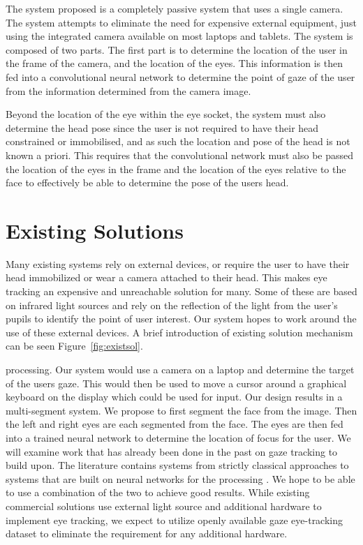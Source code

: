 \documentclass[10pt,twocolumn,letterpaper]{article}
\begin{document}
The system proposed is a completely passive system that uses a single
camera. The system attempts to eliminate the need for expensive
external equipment, just using the integrated camera available on most
laptops and tablets. The system is composed of two parts. The first
part is to determine the location of the user in the frame of the camera, and the
location of the eyes. This information is then fed into a
convolutional neural network to determine the point of gaze of the
user from the information determined from the camera image.

Beyond the location of the eye within the eye socket, the system must
also determine the head pose since the user is not required to have
their head constrained or immobilised, and as such the location and
pose of the head is not known a priori. This requires that the
convolutional network must also be passed the location of the eyes in
the frame and the location of the eyes relative to the face to effectively be
able to determine the pose of the users head.


\section{Existing Solutions}
Many existing systems rely on external
devices\cite{eyetrackerlist}\cite{tobii_1}, or require the user to
have their head immobilized or wear a camera attached to their
head. This makes eye tracking an expensive and unreachable solution
for many. Some of these are based on infrared light sources and rely
on the reflection of the light from the user's pupils to identify the
point of user interest. Our system hopes to work around the use of
these external devices. A brief introduction of existing solution
mechanism can be seen Figure~\ref{fig:existsol}.




processing. Our system would use a camera on a laptop and determine
the target of the users gaze. This would then be used to move a cursor
around a graphical keyboard on the display which could be used for
input. Our design results in a multi-segment system. We propose to
first segment the face from the image. Then the left and right eyes
are each segmented from the face. The eyes are then fed into a trained
neural network to determine the location of focus for the user. We
will examine work that has already been done in the past on gaze
tracking to build upon. The literature contains systems from strictly
classical approaches to systems that are built on neural networks for
the processing \cite{krafka} \cite{mcmurrough} \cite{weidenbacher}
\cite{baluja} \cite{cazzato} \cite{li}. We hope to be able to use a
combination of the two to achieve good results. While existing
commercial solutions use external light source and additional hardware
to implement eye tracking, we expect to utilize openly available gaze
eye-tracking dataset to eliminate the requirement for any additional
hardware.
\end{document}
